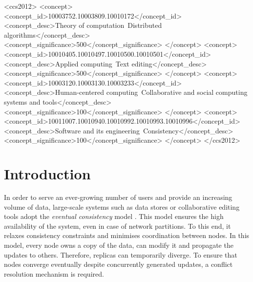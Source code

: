 \documentclass[sigplan,10pt,authorversion]{acmart}
\begin{document}
\begin{CCSXML}
    <ccs2012>
        <concept>
            <concept_id>10003752.10003809.10010172</concept_id>
            <concept_desc>Theory of computation~Distributed algorithms</concept_desc>
            <concept_significance>500</concept_significance>
        </concept>
        <concept>
            <concept_id>10010405.10010497.10010500.10010501</concept_id>
            <concept_desc>Applied computing~Text editing</concept_desc>
            <concept_significance>500</concept_significance>
        </concept>
        <concept>
            <concept_id>10003120.10003130.10003233</concept_id>
            <concept_desc>Human-centered computing~Collaborative and social computing systems and tools</concept_desc>
            <concept_significance>100</concept_significance>
        </concept>
        <concept>
            <concept_id>10011007.10010940.10010992.10010993.10010996</concept_id>
            <concept_desc>Software and its engineering~Consistency</concept_desc>
            <concept_significance>100</concept_significance>
        </concept>
    </ccs2012>
\end{CCSXML}


\maketitle

\section{Introduction}

In order to serve an ever-growing number of users and provide an increasing volume of data, large-scale systems such as data stores or collaborative editing tools adopt the \emph{eventual consistency} model \cite{10.1145/224057.224070}.
This model ensures the high availability of the system, even in case of network partitions.
To this end, it relaxes consistency constraints and minimises coordination between nodes.
In this model, every node owns a copy of the data, can modify it and propagate the updates to others.
Therefore, replicas can temporarily diverge.
To ensure that nodes converge eventually despite concurrently generated updates, a conflict resolution mechanism is required.
\end{document}
